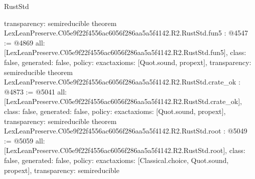 \begin{lexlean}{RustStd}
\begin{coremodule}
{  transparency: semireducible
}
theorem LexLeanPreserve.C05e9f22f4556ac6056f286aa5a5f4142.R2.RustStd.fun5 : @4547 := @4869 {
  all: [LexLeanPreserve.C05e9f22f4556ac6056f286aa5a5f4142.R2.RustStd.fun5],
  class: false,
  generated: false,
  policy: exact{axioms: [Quot.sound, propext]},
  transparency: semireducible
}
theorem LexLeanPreserve.C05e9f22f4556ac6056f286aa5a5f4142.R2.RustStd.crate_ok : @4873 := @5041 {
  all: [LexLeanPreserve.C05e9f22f4556ac6056f286aa5a5f4142.R2.RustStd.crate_ok],
  class: false,
  generated: false,
  policy: exact{axioms: [Quot.sound, propext]},
  transparency: semireducible
}
theorem LexLeanPreserve.C05e9f22f4556ac6056f286aa5a5f4142.R2.RustStd.root : @5049 := @5059 {
  all: [LexLeanPreserve.C05e9f22f4556ac6056f286aa5a5f4142.R2.RustStd.root],
  class: false,
  generated: false,
  policy: exact{axioms: [Classical.choice, Quot.sound, propext]},
  transparency: semireducible
}


\end{coremodule}
\end{lexlean}
